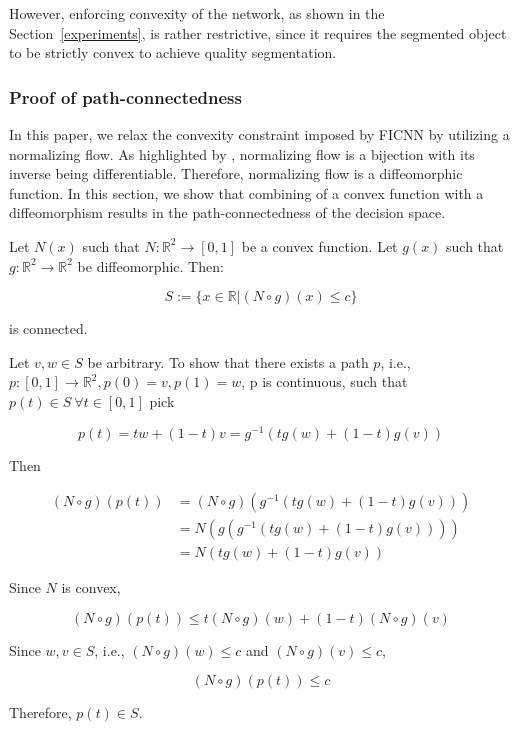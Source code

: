 However, enforcing convexity of the network, as shown in the Section~\ref{experiments}, is rather restrictive,
since it requires the segmented object to be strictly convex to achieve quality segmentation.

\subsubsection{Proof of path-connectedness}

In this paper, we relax the convexity constraint imposed by FICNN by utilizing a normalizing flow.
As highlighted by \cite{dinh2016density}, normalizing flow is a bijection with its inverse being differentiable.
Therefore, normalizing flow is a diffeomorphic function. In this section, we show that combining of a convex function with a diffeomorphism
results in the path-connectedness of the decision space.


Let $N(x)$ such that $N:\mathbb{R}^2 \rightarrow [0, 1]$ be a convex function.
Let $g(x)$ such that $g: \mathbb{R}^2 \rightarrow \mathbb{R}^2$ be diffeomorphic.
Then:

\[
    S := \{x \in \mathbb{R} | (N \circ g)(x) \le c\}
\]

is connected.

Let $v, w \in S$ be arbitrary. To show that there exists a path $p$,
i.e., $p: [0, 1] \rightarrow \mathbb{R}^2, p(0) = v, p(1) = w$, p is continuous,
such that $p(t) \in S \: \forall t\in[0, 1]$ pick

\[
    p(t) = tw + (1-t)v = g^{-1}(tg(w)+(1-t)g(v))
\]

Then

\[
    \begin{split}
        (N\circ g)(p(t)) & = (N\circ g)(g^{-1}(tg(w)+(1-t)g(v))) \\
        & = N(g(g^{-1}(tg(w)+(1-t)g(v)))) \\
        & = N(tg(w)+(1-t)g(v))
    \end{split}
\]

Since $N$ is convex,

\[
    (N\circ g)(p(t)) \le t(N\circ g)(w) + (1-t)(N\circ g)(v)
\]

Since $w,v \in S$, i.e., $(N\circ g)(w) \le c$ and $(N\circ g)(v) \le c$,

\[
    (N\circ g)(p(t)) \le c
\]

Therefore, $p(t) \in S$.